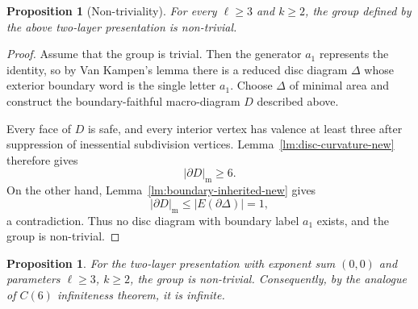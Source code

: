 \documentclass{article}
\newtheorem{prop}[theorem]{Proposition}
\begin{document}
\begin{prop}[Non-triviality]\label{prop:two-layer-marked-nontrivial-new}
For every $\ell\geq3$ and $k\geq2$, the group defined by the above two-layer
presentation is non-trivial.
\end{prop}

\begin{proof}
Assume that the group is trivial.  Then the generator $a_1$ represents the
identity, so by Van Kampen's lemma there is a reduced disc diagram $\Delta$
whose exterior boundary word is the single letter $a_1$.  Choose $\Delta$ of
minimal area and construct the boundary-faithful macro-diagram $D$ described
above.

Every face of $D$ is safe, and every
interior vertex has valence at least three after suppression of inessential
subdivision vertices.  Lemma~\ref{lm:disc-curvature-new} therefore gives
\[
        |\partial D|_{\mathrm m}\geq6.
\]
On the other hand, Lemma~\ref{lm:boundary-inherited-new} gives
\[
        |\partial D|_{\mathrm m}
        \leq |E(\partial\Delta)|
        =1,
\]
a contradiction.  Thus no disc diagram with boundary label $a_1$ exists,
and the group is non-trivial.
\end{proof}





\begin{prop}
For the two-layer presentation with exponent sum $(0,0)$ and parameters
$\ell\geq 3$, $k\geq 2$, the group is non-trivial.  Consequently, by the analogue of
$C(6)$ infiniteness theorem, it is infinite.
\end{prop}

\end{document}
